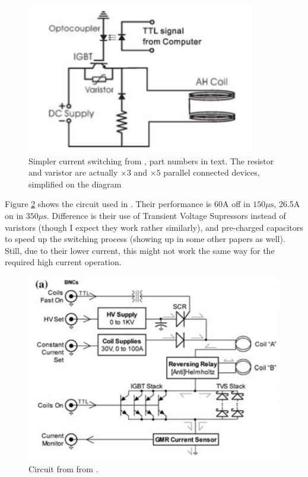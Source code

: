\documentclass[12pt,a4paper]{article}
\begin{document}
\begin{figure}[ht!]
\centering
\includegraphics[width=100mm]{Yum2012_circuit.png}
\caption{Simpler current switching from \citet{Yum2012}, part numbers in text. The resistor and varistor are actually $\times 3$ and $\times 5$ parallel connected devices, simplified on the diagram}
\label{fig:yum2012circuit}
\end{figure}

Figure \ref{fig:atomchipcircuit} shows the circuit used in \citet{Aubin2005}. Their performance is 60A off in $150 \mu \mathrm{s}$, 26.5A on in $350 \mu \mathrm{s}$. Difference is their use of Transient Voltage Supressors instead of varistors (though I expect they work rather similarly), and pre-charged capacitors to speed up the switching process (showing up in some other papers as well). Still, due to their lower current, this might not work the same way for the required high current operation.

\begin{figure}[ht!]
\centering
\includegraphics[width=120mm]{atomchipcircuit.png}
\caption{Circuit from from \citet{Aubin2005}.}
\label{fig:atomchipcircuit}
\end{figure}
\end{document}
